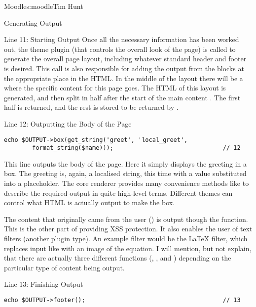 \begin{aosachapter}{Moodle}{s:moodle}{Tim Hunt}
\begin{aosasect1}{Generating Output}
\begin{aosasect2}{Line 11: Starting Output}
Once all the necessary information has been worked out, the theme
plugin (that controls the overall look of the page) is called to
generate the overall page layout, including whatever standard header
and footer is desired. This call is also responsible for adding the
output from the blocks at the appropriate place in the HTML. In the
middle of the layout there will be a  where the specific content
for this page goes. The HTML of this layout is generated, and then
split in half after the start of the main content . The first half
is returned, and the rest is stored to be returned by
.

\end{aosasect2}

\begin{aosasect2}{Line 12: Outputting the Body of the Page}

\begin{verbatim}
echo $OUTPUT->box(get_string('greet', 'local_greet',
        format_string($name)));                               // 12
\end{verbatim}

This line outputs the body of the page. Here it simply displays the
greeting in a box. The greeting is, again, a localised string, this time
with a value substituted into a placeholder. The core renderer
 provides many convenience methods like  to
describe the required output in quite high-level terms. Different
themes can control what HTML is actually output to make the box.

The content that originally came from the user () is
output though the  function. This is the other
part of providing XSS protection. It also enables the user of text
filters (another plugin type). An example filter would be the LaTeX
filter, which replaces input like  with an image
of the equation. I will mention, but not explain, that there are
actually three different functions (, ,
and ) depending on the particular type of content
being output.

\end{aosasect2}

\begin{aosasect2}{Line 13: Finishing Output}

\begin{verbatim}
echo $OUTPUT->footer();                                       // 13
\end{verbatim}


\end{aosasect2}
\end{aosasect1}
\end{aosachapter}
